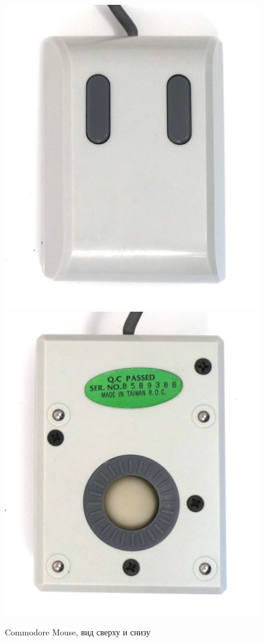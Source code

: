 \documentclass[11pt, a4paper]{article}
\begin{document}
\begin{figure}[h]
    \centering
    \includegraphics[scale=0.7]{1986_commodore_c300_mouse/3verh_60.jpg}
    \includegraphics[scale=0.7]{1986_commodore_c300_mouse/3niz_60.jpg}
    \caption{Commodore Mouse, вид сверху и снизу}
    \label{fig:C300TopAndBottom}
\end{figure}
\end{document}
